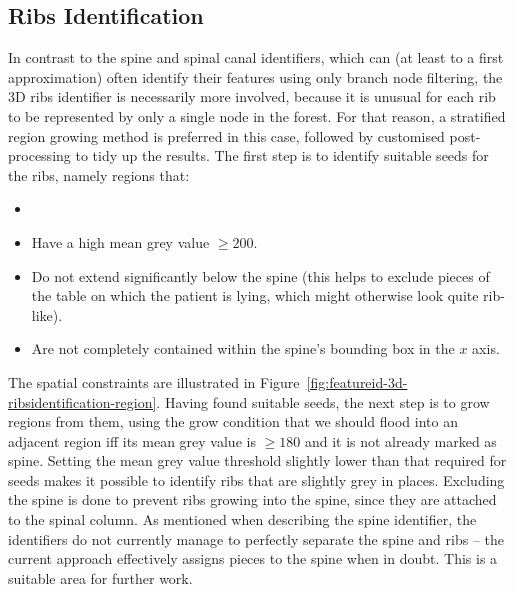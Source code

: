 
\afterpage{\clearpage}
\newpage

\subsection{Ribs Identification}
\label{subsec:featureid-3d-ribsidentification}



\noindent In contrast to the spine and spinal canal identifiers, which can (at least to a first approximation) often identify their features using only branch node filtering, the 3D ribs identifier is necessarily more involved, because it is unusual for each rib to be represented by only a single node in the forest. For that reason, a stratified region growing method is preferred in this case, followed by customised post-processing to tidy up the results. The first step is to identify suitable seeds for the ribs, namely regions that:
%
\begin{itemize}

\item {}
\item Have a high mean grey value $\ge 200$.
\item Do not extend significantly below the spine (this helps to exclude pieces of the table on which the patient is lying, which might otherwise look quite rib-like).
\item Are not completely contained within the spine's bounding box in the $x$ axis.

\end{itemize}
%
The spatial constraints are illustrated in Figure~\ref{fig:featureid-3d-ribsidentification-region}. Having found suitable seeds, the next step is to grow regions from them, using the grow condition that we should flood into an adjacent region iff its mean grey value is $\ge 180$ and it is not already marked as spine. Setting the mean grey value threshold slightly lower than that required for seeds makes it possible to identify ribs that are slightly grey in places. Excluding the spine is done to prevent ribs growing into the spine, since they are attached to the spinal column. As mentioned when describing the spine identifier, the identifiers do not currently manage to perfectly separate the spine and ribs -- the current approach effectively assigns pieces to the spine when in doubt. This is a suitable area for further work.

